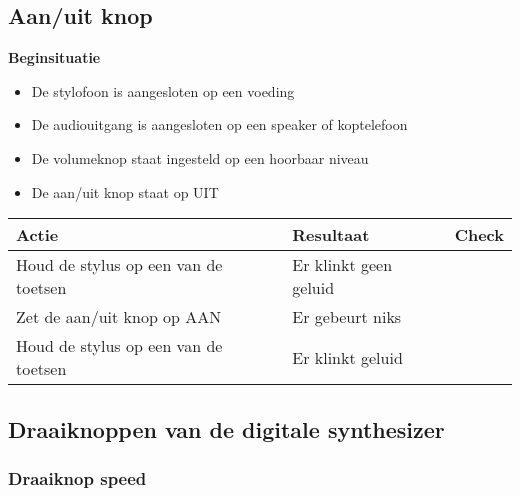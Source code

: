 \documentclass[12pt, a4paper, dutch]{article}
\newcommand{\cb}{\Square}
\newcommand{\stroom}{De stylofoon is aangesloten op een voeding}
\newcommand{\audio}{De audiouitgang is aangesloten op een speaker of koptelefoon}
\newcommand{\vol}{De volumeknop staat ingesteld op een hoorbaar niveau}
\begin{document}
\subsection{Aan/uit knop}

\begin{minipage}{\textwidth}
\textbf{Beginsituatie}
\begin{itemize}
	\item \stroom
	\item \audio
	\item \vol
	\item De aan/uit knop staat op UIT
\end{itemize}

\medskip

\begin{tabularx}{\textwidth}{p{}p{}>{\raggedleft\arraybackslash}X}
\toprule
\textbf{Actie} & \textbf{Resultaat} & \textbf{Check}\\
\midrule
Houd de stylus op een van de toetsen &
Er klinkt geen geluid &
\cb\\

Zet de aan/uit knop op AAN &
Er gebeurt niks &
\cb\\

Houd de stylus op een van de toetsen &
Er klinkt geluid &
\cb\\
\bottomrule
\end{tabularx}
\end{minipage}

\subsection{Draaiknoppen van de digitale synthesizer}

\subsubsection{Draaiknop speed}
\end{document}
